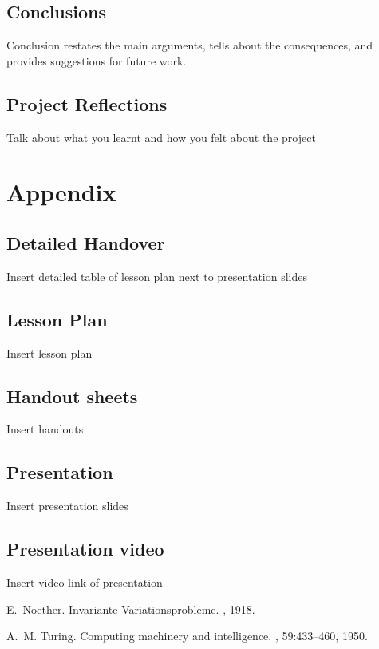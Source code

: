 \documentclass[12pt, a4paper,oneside]{book}
\numberwithin{equation}{section}
\begin{document}
\section{Conclusions}
Conclusion restates the main arguments, tells about the consequences, and provides suggestions for future work.

\section{Project Reflections}
Talk about what you learnt and how you felt about the project

\chapter*{Appendix}
\appendix
{}

\section*{Detailed Handover}
Insert detailed table of lesson plan next to presentation slides

\section*{Lesson Plan}
Insert lesson plan

\section*{Handout sheets}\label{secx}
Insert handouts

\section*{Presentation}\label{secx.x}
Insert presentation slides

\section*{Presentation video}\label{secx.x}
Insert video link of presentation


\begin{thebibliography}{999}

E.~Noether.
\newblock Invariante {V}ariationsprobleme.
, 1918.

A.~M. Turing.
\newblock Computing machinery and intelligence.
, 59:433--460, 1950.

\end{thebibliography}
\end{document}
